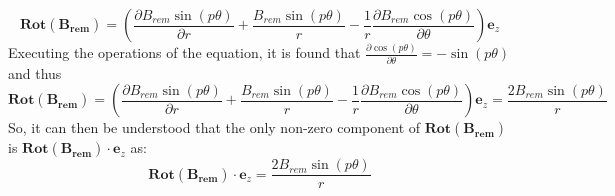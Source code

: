 \documentclass{article}
\begin{document}
\begin{equation}
    \mathbf{Rot(B_{rem})}=\left(\frac{\partial B_{\mathit{rem}}\sin\left(p\mathit{\theta}\right)}{\partial r}+\frac{B_{\mathit{rem}}\sin\left(p\mathit{\theta}\right)}{r}-\frac{1}{r}\frac{\partial B_{\mathit{rem}}\cos\left(p\mathit{\theta}\right)}{\partial \theta}\right)\mathbf{e}_{z}
\end{equation}
Executing the operations of the equation, it is found that $\frac{\partial \cos\left(p\mathit{\theta}\right)}{\partial \theta}=-\sin\left(p\mathit{\theta}\right)$ and thus 
\begin{equation}
    \mathbf{Rot(B_{rem})}=\left(\frac{\partial B_{\mathit{rem}}\sin\left(p\mathit{\theta}\right)}{\partial r}+\frac{B_{\mathit{rem}}\sin\left(p\mathit{\theta}\right)}{r}-\frac{1}{r}\frac{\partial B_{\mathit{rem}}\cos\left(p\mathit{\theta}\right)}{\partial \theta}\right)\mathbf{e}_{z} = \frac{2B_{\mathit{rem}}\sin\left(p\mathit{\theta}\right)}{r}
\end{equation}
So, it can then be understood that the only non-zero component of $\mathbf{Rot(B_{rem})}$ is $\mathbf{Rot(B_{rem})} \cdot \mathbf{e}_z$ as:
\begin{equation}
    \mathbf{Rot(B_{rem})} \cdot \mathbf{e}_z = \frac{2B_{\mathit{rem}}\sin\left(p\mathit{\theta}\right)}{r}
\end{equation}
\end{document}
